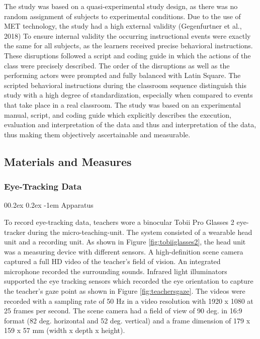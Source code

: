 \documentclass[
  man]{apa6}
\makeatletter
\let\oldparagraph\paragraph
\renewcommand{\paragraph}[1]{\oldparagraph{#1}\mbox{}}
\renewcommand{\paragraph}{\@startsection{paragraph}{4}{\parindent}%
  {0\baselineskip \@plus 0.2ex \@minus 0.2ex}%
  {-1em}%
  {\normalfont\normalsize\bfseries\itshape\typesectitle}}
\makeatother
\begin{document}
The study was based on a quasi-experimental study design, as there was no random assignment of subjects to experimental conditions. Due to the use of MET technology, the study had a high external validity (Gegenfurtner et al., 2018) To ensure internal validity the occurring instructional events were exactly the same for all subjects, as the learners received precise behavioral instructions. These disruptions followed a script and coding guide in which the actions of the class were precisely described. The order of the disruptions as well as the performing actors were prompted and fully balanced with Latin Square. The scripted behavioral instructions during the classroom sequence distinguish this study with a high degree of standardization, especially when compared to events that take place in a real classroom. The study was based on an experimental manual, script, and coding guide which explicitly describes the execution, evaluation and interpretation of the data and thus and interpretation of the data, thus making them objectively ascertainable and measurable.

\subsection{Materials and Measures}\label{materials-and-measures}

\subsubsection{Eye-Tracking Data}\label{eye-tracking-data}

\paragraph{Apparatus}\label{apparatus}

To record eye-tracking data, teachers wore a binocular Tobii Pro Glasses 2 eye-tracker during the micro-teaching-unit. The system consisted of a wearable head unit and a recording unit. As shown in Figure \ref{fig:tobiiglasses2}, the head unit was a measuring device with different sensors. A high-definition scene camera captured a full HD video of the teacher's field of vision. An integrated microphone recorded the surrounding sounds. Infrared light illuminators supported the eye tracking sensors which recorded the eye orientation to capture the teacher's gaze point as shown in Figure \ref{fig:teachersgaze}. The videos were recorded with a sampling rate of 50 Hz in a video resolution with 1920 x 1080 at 25 frames per second. The scene camera had a field of view of 90 deg. in 16:9 format (82 deg. horizontal and 52 deg. vertical) and a frame dimension of 179 x 159 x 57 mm (width x depth x height).
\end{document}
